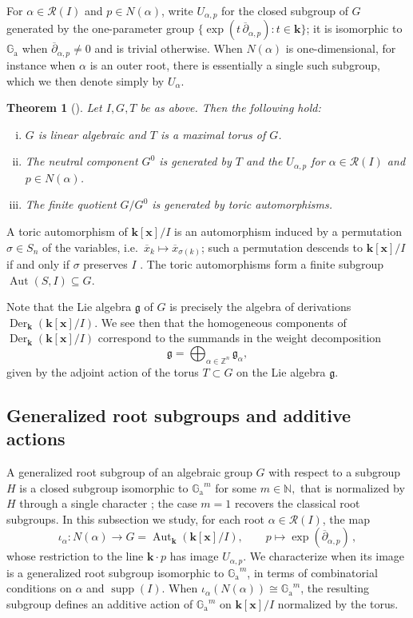 \documentclass[11pt,letterpaper,reqno]{amsart}
\newtheorem{theorem}{Theorem}[section]
\theoremstyle{remark}
\theoremstyle{definition}
\def\XX{\mathbf{x}}
\newcommand{\KK}[0]{\ensuremath{\mathbf{k}}}
\newcommand{\ZZ}[0]{\ensuremath{\mathbb{Z}}}
\newcommand{\GA}[0]{\ensuremath{\mathbb{G}_{\mathrm{a}}}}
\newcommand{\supp}[0]{\ensuremath{\operatorname{supp}}}
\newcommand{\Aut}[0]{\ensuremath{\operatorname{Aut}}}
\newcommand{\Der}[0]{\ensuremath{\operatorname{Der}}}
\begin{document}
For $\alpha\in\mathcal R(I)$ and $p\in N(\alpha)$, write $U_{\alpha,p}$
for the closed subgroup of $G$ generated by the one-parameter group
$\{\exp(t\,\overline\partial_{\alpha,p}):t\in\KK\}$; it is isomorphic to $\GA$ when
$\overline\partial_{\alpha,p}\neq0$ and is trivial otherwise. When $N(\alpha)$ is
one-dimensional, for instance when $\alpha$ is an outer root, there is essentially a
single such subgroup, which we then denote simply by $U_\alpha$.

\begin{theorem}[{\cite[Theorem~4.21]{DLMR24}}]\label{thm:dlmr}
Let $I,G,T$ be as above. Then the following hold:
\begin{enumerate}[(i)]
    \item $G$ is linear algebraic and $T$ is a maximal torus of $G$.
    \item The neutral component $G^0$ is generated by $T$ and the $U_{\alpha, p}$ for $\alpha\in\mathcal R(I)$ and $p\in N(\alpha)$.
    \item The finite quotient $G/G^0$ is generated by toric automorphisms.
\end{enumerate}
\end{theorem}

A toric automorphism of $\KK[\XX]/I$ is an automorphism induced by a
permutation $\sigma\in S_n$ of the variables, i.e.\ $\overline{x}_k\mapsto
\overline{x}_{\sigma(k)}$; such a permutation descends to $\KK[\XX]/I$ if and
only if $\sigma$ preserves $I$ \cite[Definition~4.14]{DLMR24}. The toric
automorphisms form a finite subgroup $\Aut(S,I)\subseteq G$.

Note that the Lie algebra $\mathfrak g$ of $G$ is precisely the algebra of derivations $\Der_\KK(\KK[\XX]/I)$. We see then that the homogeneous components of $\Der_\KK(\KK[\XX]/I)$ correspond to the summands in the weight decomposition
$$\mathfrak g=\bigoplus_{\alpha\in\ZZ^n}\mathfrak g_\alpha,$$
given by the adjoint action of the torus $T\subset G$ on the Lie algebra $\mathfrak g$.


\subsection{Generalized root subgroups and additive actions}\label{sec:root-subgroups}

A generalized root subgroup of an algebraic group $G$ with respect to
a subgroup $H$ is a closed subgroup isomorphic to $\GA^m$ for some $m\in\mathbb{N},$ that is normalized
by $H$ through a single character \cite[Definition~7.1]{RV21b}; the case
$m=1$ recovers the classical root subgroups. In this subsection we study, for
each root $\alpha\in\mathcal R(I)$, the map
$$\iota_\alpha\colon N(\alpha)\longrightarrow G=\Aut_\KK(\KK[\XX]/I),\qquad
p\longmapsto\exp(\overline\partial_{\alpha,p})\,,$$
whose restriction to the line $\KK\cdot p$ has image $U_{\alpha,p}$.
We characterize when
its image is a generalized root subgroup isomorphic to $\GA^m$, in terms of
combinatorial conditions on $\alpha$ and $\supp(I)$. When $\iota_\alpha(N(\alpha))\cong\GA^m$, the resulting subgroup defines an additive action of $\GA^m$ on $\KK[\XX]/I$ normalized by the torus.
\end{document}

